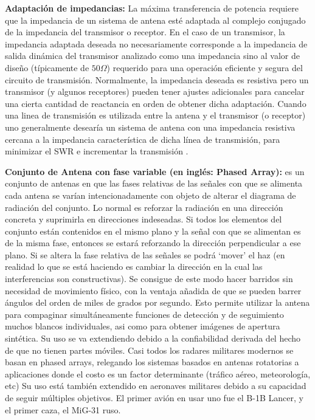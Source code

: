 {\textbf{Adaptación de impedancias:}} La máxima transferencia de potencia requiere que la impedancia de un sistema de
antena esté adaptada al complejo conjugado de la impedancia del transmisor o receptor. En el caso de un transmisor,
la impedancia adaptada deseada no necesariamente corresponde a la impedancia de salida dinámica del transmisor analizado
como una impedancia sino al valor de diseño (típicamente de $50 \Omega$) requerido para una operación eficiente
y segura del circuito de transmisión. Normalmente, la impedancia deseada es resistiva pero un transmisor (y algunos receptores)
pueden tener ajustes adicionales para cancelar una cierta cantidad de reactancia en orden de obtener dicha adaptación. Cuando
una linea de transmisión es utilizada entre la antena y el transmisor (o receptor) uno generalmente desearía un sistema de antena
con una impedancia resistiva cercana a la impedancia característica de dicha línea de transmisión, para minimizar el SWR
e incrementar la transmisión \cite{AntennaWiki}.

{\textbf{Conjunto de Antena con fase variable (en inglés: Phased Array):}} es un conjunto de antenas en que las fases relativas
de las señales con que se alimenta cada antena se varían intencionadamente con objeto de alterar el diagrama de radiación del
conjunto. Lo normal es reforzar la radiación en una dirección concreta y suprimirla en direcciones indeseadas. Si todos los
elementos del conjunto están contenidos en el mismo plano y la señal con que se alimentan es de la misma fase,
entonces se estará reforzando la dirección perpendicular a ese plano. Si se altera la fase relativa de las señales se podrá
\enquote*{mover} el haz (en realidad lo que se está haciendo es cambiar la dirección en la cual las interferencias son
constructivas). Se consigue de este modo hacer barridos sin necesidad de movimiento físico, con la ventaja añadida de que
se pueden barrer ángulos del orden de miles de grados por segundo. Esto permite utilizar la antena para compaginar
simultáneamente funciones de detección y de seguimiento muchos blancos individuales, asi como para obtener imágenes de
apertura sintética. Su uso se va extendiendo debido a la confiabilidad derivada del hecho de que no tienen partes móviles.
Casi todos los radares militares modernos se basan en phased arrays, relegando los sistemas basados en antenas rotatorias a
aplicaciones donde el costo es un factor determinante (tráfico aéreo, meteorología, etc) Su uso está también extendido en
aeronaves militares debido a su capacidad de seguir múltiples objetivos. El primer avión en usar uno fue el B-1B Lancer, y
el primer caza, el MiG-31 ruso.\\

